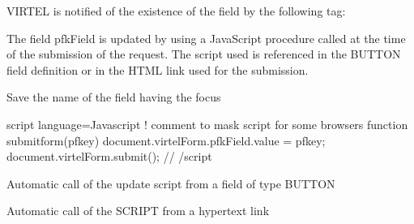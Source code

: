 \documentclass[letterpaper,10pt,english]{sphinxmanual}
\begin{document}
VIRTEL is notified of the existence of the field by the following tag:

\begin{sphinxVerbatim}[commandchars=\\\{\}]
    
\end{sphinxVerbatim}


The field pfkField is updated by using a JavaScript procedure called at the time of the submission of the request. The
script used is referenced in the BUTTON field definition or in the HTML link used for the submission.

Save the name of the field having the focus

\begin{sphinxVerbatim}[commandchars=\\\{\}]
\PYGZlt{}script language=\PYGZdq{}Javascript\PYGZdq{}\PYGZgt{}
\PYGZlt{}!\PYGZhy{}\PYGZhy{} comment to mask script for some browsers
function submitform(pfkey)
\PYGZob{}
    document.virtelForm.pfkField.value = pfkey;
    document.virtelForm.submit();
\PYGZcb{}
//\PYGZhy{}\PYGZhy{}\PYGZgt{}
\PYGZlt{}/script\PYGZgt{}
\end{sphinxVerbatim}

Automatic call of the update script from a field of type BUTTON

\begin{sphinxVerbatim}[commandchars=\\\{\}]
   
\end{sphinxVerbatim}

Automatic call of the SCRIPT from a hypertext link

\begin{sphinxVerbatim}[commandchars=\\\{\}]
    
\end{sphinxVerbatim}
\end{document}

